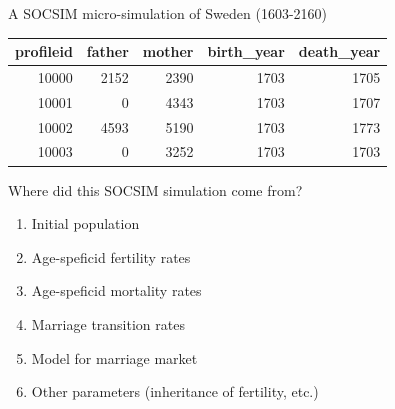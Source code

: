 \documentclass[
  ignorenonframetext,
]{beamer}
\newenvironment{Shaded}{\begin{snugshade}}{\end{snugshade}}
\newcommand{\CommentTok}[1]{\textcolor[rgb]{0.56,0.35,0.01}{\textit{#1}}}
\newcommand{\DecValTok}[1]{\textcolor[rgb]{0.00,0.00,0.81}{#1}}
\newcommand{\KeywordTok}[1]{\textcolor[rgb]{0.13,0.29,0.53}{\textbf{#1}}}
\newcommand{\NormalTok}[1]{#1}
\newcommand{\OperatorTok}[1]{\textcolor[rgb]{0.81,0.36,0.00}{\textbf{#1}}}
\newcommand{\StringTok}[1]{\textcolor[rgb]{0.31,0.60,0.02}{#1}}
\providecommand{\tightlist}{%
  \setlength{\itemsep}{0pt}\setlength{\parskip}{0pt}}
\begin{document}
\begin{frame}[fragile]{A SOCSIM micro-simulation of Sweden (1603-2160)}
\protect\hypertarget{a-socsim-micro-simulation-of-sweden-1603-2160-1}{}

\begin{Shaded}
\end{Shaded}

\begin{longtable}[]{@{}rrrrr@{}}
\toprule
profileid & father & mother & birth\_year & death\_year\tabularnewline
\midrule
\endhead
10000 & 2152 & 2390 & 1703 & 1705\tabularnewline
10001 & 0 & 4343 & 1703 & 1707\tabularnewline
10002 & 4593 & 5190 & 1703 & 1773\tabularnewline
10003 & 0 & 3252 & 1703 & 1703\tabularnewline
\bottomrule
\end{longtable}

\end{frame}

\begin{frame}{Where did this SOCSIM simulation come from?}
\protect\hypertarget{where-did-this-socsim-simulation-come-from}{}

\begin{enumerate}
\tightlist
\item
  Initial population
\item
  Age-speficid fertility rates
\item
  Age-speficid mortality rates
\item
  Marriage transition rates
\item
  Model for marriage market
\item
  Other parameters (inheritance of fertility, etc.)
\end{enumerate}

\end{frame}
\end{document}
